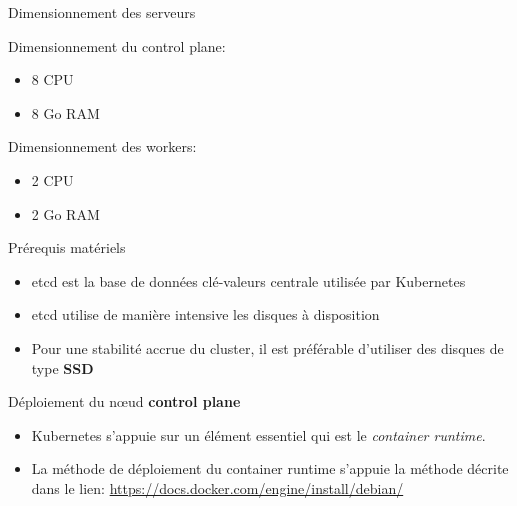 
\begin{frame}[fragile]{Dimensionnement des serveurs}

   Dimensionnement du control plane:

   \begin{itemize}
      \item 8 CPU
      \item 8 Go RAM
   \end{itemize}

   Dimensionnement des workers:

   \begin{itemize}
      \item 2 CPU
      \item 2 Go RAM
   \end{itemize}

\end{frame}


\begin{frame}[fragile]{Prérequis matériels}

   \begin{itemize}
      \item etcd est la base de données clé-valeurs centrale utilisée par Kubernetes
      \item etcd utilise de manière intensive les disques à disposition
      \item Pour une stabilité accrue du cluster, il est préférable d'utiliser des disques de type \textbf{SSD}
   \end{itemize}

\end{frame}


\begin{frame}[fragile]{Déploiement du n{\oe}ud \textbf{control plane}}

   \begin{itemize}
      \item Kubernetes s'appuie sur un élément essentiel qui est le \textit{container runtime}.
      \item La méthode de déploiement du container runtime s'appuie la méthode décrite dans le lien: \url{https://docs.docker.com/engine/install/debian/}
   \end{itemize}

\end{frame}

